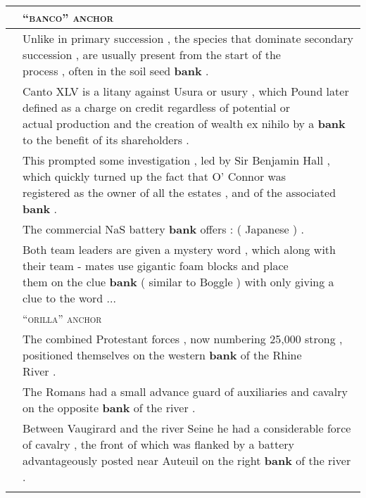 \documentclass[11pt,a4paper]{article}
\begin{document}
\begin{table*}[t]
\small
\begin{center}
    \small
    \begin{tabular}{ll}
    \toprule
     & \textsc{``banco'' anchor}        \\ 
    \hline \addlinespace[0.5ex]
    1 & \specialcell{Unlike in primary succession , the species that dominate secondary succession , are usually present from the start of the\\ process , often in the soil seed \textbf{bank} .}                  \\ \addlinespace[0.5ex]
    2 & \specialcell{Canto XLV is a litany against Usura or usury , which Pound later defined as a charge on credit regardless of potential or\\ actual production and the creation of wealth ex nihilo by a \textbf{bank} to the benefit of its shareholders .}               \\ \addlinespace[0.5ex]
    3 & \specialcell{This prompted some investigation , led by Sir Benjamin Hall , which quickly turned up the fact that O' Connor was\\ registered as the owner of all the estates , and of the associated \textbf{bank} . }           \\ \addlinespace[0.5ex]
    4 & The commercial NaS battery \textbf{bank} offers : ( Japanese ) .                \\ \addlinespace[0.5ex]
    5 & \specialcell{Both team leaders are given a mystery word , which along with their team - mates use gigantic foam blocks and place\\ them on the clue \textbf{bank} ( similar to Boggle ) with only giving a clue to the word ...}               \\ \addlinespace[0.5ex]
    \midrule
     & \textsc{``orilla'' anchor}        \\ 
    \hline \addlinespace[0.5ex]
    1 & \specialcell{The combined Protestant forces , now numbering 25,000 strong , positioned themselves on the western \textbf{bank} of the Rhine\\ River . }                 \\ \addlinespace[0.5ex]
    2 & The Romans had a small advance guard of auxiliaries and cavalry on the opposite \textbf{bank} of the river .               \\ \addlinespace[0.5ex]
    3 & \specialcell{Between Vaugirard and the river Seine he had a considerable force of cavalry , the front of which was flanked by a battery \\ advantageously posted near Auteuil on the right \textbf{bank} of the river .}            \\ \addlinespace[0.5ex]

\end{tabular}
\end{center}
\end{table*}
\end{document}
